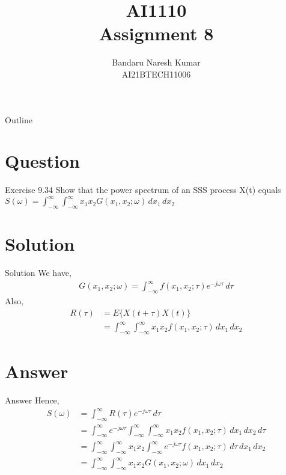 \documentclass{beamer}
\title{AI1110 \\ Assignment 8}
\author{Bandaru Naresh Kumar \\ AI21BTECH11006}
\date{}
\begin{document}
	\begin{frame}
		\titlepage
	\end{frame}
	
	\begin{frame}{Outline}
    		\tableofcontents
	\end{frame}
	
	\section{Question}
	\begin{frame}{Exercise 9.34}
       Show that the power spectrum of an SSS process X(t) equals\\
       $ S(\omega) = \int_{-\infty}^{\infty}\int_{-\infty}^{\infty}x_1x_2G(x_1,x_2;\omega)\,dx_1\,dx_2 $ 
	\end{frame}
	
	\section{Solution}
	\begin{frame}{Solution}
	    We have,\\
	    \begin{align}
	    G(x_1,x_2;\omega) = \int_{-\infty}^{\infty}f(x_1,x_2;\tau)e^{-j\omega\tau}\,d\tau
	    \end{align}
	    Also,
	  \begin{align}
	  R(\tau) &= E\{X(t+\tau)X(t)\}\\
	          &= \int_{-\infty}^{\infty}\int_{-\infty}^{\infty}x_1x_2f(x_1,x_2;\tau)\,dx_1\,dx_2
	  \end{align}
	 \end{frame}
	 
	\section{Answer}
	\begin{frame}{Answer}
	   Hence,\\
	   \begin{align}
	   S(\omega) &= \int_{-\infty}^{\infty}R(\tau)e^{-j\omega\tau}\,d\tau\\
	             &= \int_{-\infty}^{\infty}e^{-j\omega\tau}\int_{-\infty}^{\infty}\int_{-\infty}^{\infty}x_1x_2f(x_1,x_2;\tau)\,dx_1\,dx_2\,d\tau\\
	             &= \int_{-\infty}^{\infty}\int_{-\infty}^{\infty}x_1x_2\int_{-\infty}^{\infty}e^{-j\omega\tau}f(x_1,x_2;\tau)\,d\tau\,dx_1\,dx_2\\
	             &= \int_{-\infty}^{\infty}\int_{-\infty}^{\infty}x_1x_2G(x_1,x_2;\omega)\,dx_1\,dx_2
	   \end{align}
	   
	\end{frame}
	
\end{document}
